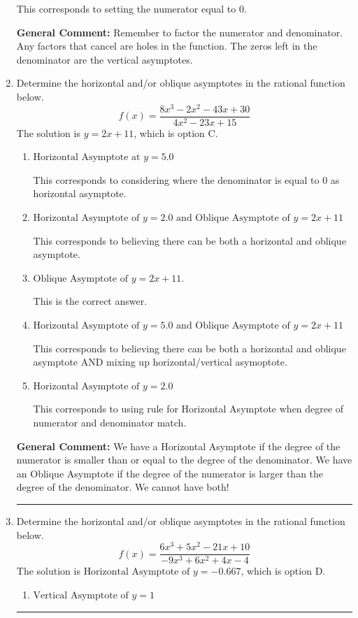 \documentclass{extbook}[14pt]
\newcommand{\litem}[1]{\item #1

\rule{\textwidth}{0.4pt}}
\begin{document}
\begin{enumerate}
{\begin{enumerate}[label=\Alph*.]
This corresponds to setting the numerator equal to 0.
\end{enumerate}

\textbf{General Comment:} Remember to factor the numerator and denominator. Any factors that cancel are holes in the function. The zeros left in the denominator are the vertical asymptotes.
}
\litem{
Determine the horizontal and/or oblique asymptotes in the rational function below.
\[ f(x) = \frac{8x^{3} -2 x^{2} -43 x + 30}{4x^{2} -23 x + 15} \]The solution is \( y = 2x + 11 \), which is option C.\begin{enumerate}[label=\Alph*.]
\item \( \text{Horizontal Asymptote at } y = 5.0 \)

This corresponds to considering where the denominator is equal to 0 as horizontal asymptote.
\item \( \text{Horizontal Asymptote of } y = 2.0 \text{ and Oblique Asymptote of } y = 2x + 11 \)

This corresponds to believing there can be both a horizontal and oblique asymptote.
\item \( \text{Oblique Asymptote of } y = 2x + 11. \)

This is the correct answer.
\item \( \text{Horizontal Asymptote of } y = 5.0 \text{ and Oblique Asymptote of } y = 2x + 11 \)

This corresponds to believing there can be both a horizontal and oblique asymptote AND mixing up horizontal/vertical asymoptote.
\item \( \text{Horizontal Asymptote of } y = 2.0  \)

This corresponds to using rule for Horizontal Asymptote when degree of numerator and denominator match.
\end{enumerate}

\textbf{General Comment:} We have a Horizontal Asymptote if the degree of the numerator is smaller than or equal to the degree of the denominator. We have an Oblique Asymptote if the degree of the numerator is larger than the degree of the denominator. We cannot have both!
}
\litem{
Determine the horizontal and/or oblique asymptotes in the rational function below.
\[ f(x) = \frac{6x^{3} +5 x^{2} -21 x + 10}{-9x^{3} +6 x^{2} +4 x -4} \]The solution is \( \text{Horizontal Asymptote of } y = -0.667  \), which is option D.\begin{enumerate}[label=\Alph*.]
\item \( \text{Vertical Asymptote of } y = 1  \)


\end{enumerate}}
\end{enumerate}
\end{document}
